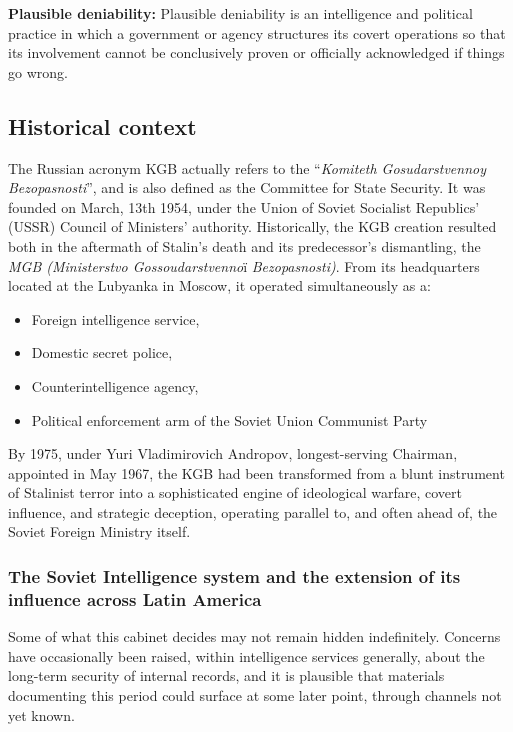 \textbf{Plausible deniability:} Plausible deniability is an intelligence and political practice in which a government or agency structures its covert operations so that its involvement cannot be conclusively proven or officially acknowledged if things go wrong.

\subsection{Historical context}

The Russian acronym KGB actually refers to the “\emph{Komiteth Gosudarstvennoy Bezopasnosti}”, and is also defined as the Committee for State Security. It was founded on March, 13th 1954, under the Union of Soviet Socialist Republics’ (USSR) Council of Ministers’ authority. Historically, the KGB creation resulted both in the aftermath of Stalin’s death and its predecessor’s dismantling, the \emph{MGB (Ministerstvo Gossoudarstvenno}ï \emph{Bezopasnosti)}. From its headquarters located at the Lubyanka in Moscow, it operated simultaneously as a:

\begin{itemize}
  \item Foreign intelligence service,
  \item Domestic secret police,
  \item Counterintelligence agency,
  \item Political enforcement arm of the Soviet Union Communist Party
\end{itemize}

By 1975, under Yuri Vladimirovich Andropov, longest-serving Chairman, appointed in May 1967,  the KGB had been transformed from a blunt instrument of Stalinist terror into a sophisticated engine of ideological warfare, covert influence, and strategic deception, operating parallel to, and often ahead of, the Soviet Foreign Ministry itself.

\subsubsection{The Soviet Intelligence system and the extension of its influence across Latin America}

Some of what this cabinet decides may not remain hidden indefinitely. Concerns have occasionally been raised, within intelligence services generally, about the long-term security of internal records, and it is plausible that materials documenting this period could surface at some later point, through channels not yet known.

